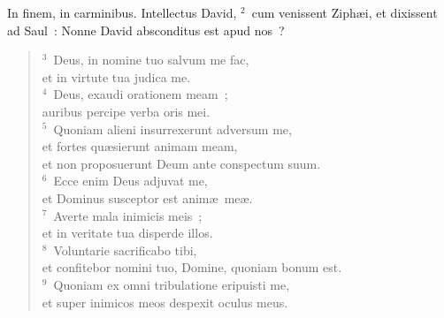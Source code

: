\lettrine[lines=3,image=true,loversize=0.05,lraise=-0.03]{I}{}n finem, in carminibus. Intellectus David,
${}^{2}$~cum venissent Ziph\ae i, et dixissent ad Saul~: Nonne David absconditus est apud nos~?
\begin{flushleft}\begin{verse}${}^{3}$~Deus, in nomine tuo salvum me fac,\\ et in virtute tua judica me.\\
${}^{4}$~Deus, exaudi orationem meam~;\\ auribus percipe verba oris mei.\\
${}^{5}$~Quoniam alieni insurrexerunt adversum me,\\ et fortes qu\ae sierunt animam meam,\\ et non proposuerunt Deum ante conspectum suum.\\
${}^{6}$~Ecce enim Deus adjuvat me,\\ et Dominus susceptor est anim\ae\ me\ae .\\
${}^{7}$~Averte mala inimicis meis~;\\ et in veritate tua disperde illos.\\
${}^{8}$~Voluntarie sacrificabo tibi,\\ et confitebor nomini tuo, Domine, quoniam bonum est.\\
${}^{9}$~Quoniam ex omni tribulatione eripuisti me,\\ et super inimicos meos despexit oculus meus.\end{verse}\end{flushleft}



